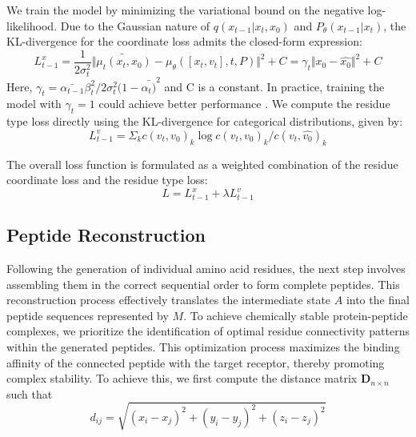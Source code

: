 \vspace{3pt} \noindent
We train the model by minimizing the variational bound on the negative log-likelihood. Due to the Gaussian nature of $q(x_{t-1}|x_t, x_0)$ and $P_{\theta}(x_{t-1}|x_t)$, the KL-divergence for the coordinate loss admits the closed-form expression:
$$L_{t-1}^x = \frac{1}{2\sigma_t^2} \Vert{\tilde{\mu_t(x_t, x_0)} - \mu_{\theta}([x_t, v_t], t, P)}\Vert^2 + C = \gamma_t\Vert{x_0 - \hat{x_0}}\Vert^2 + C$$
Here, $\gamma_t = \bar{\alpha_{t-1}}\beta_t^2/2\sigma_t^2(1-\bar{\alpha_t)}^2$ and C is a constant. In practice, training the model with $\gamma_t = 1$ could achieve better performance \cite{ho2020denoising}. We compute the residue type loss directly using the KL-divergence for categorical distributions, given by:
$$L_{t-1}^v = \Sigma_{k} c(v_t, v_0)_{k} \log c(v_t, v_0)_{k}/c(v_t, \hat{v_0})_{k}$$

\vspace{3pt} \noindent
The overall loss function is formulated as a weighted combination of the residue coordinate loss and the residue type loss:
$$L = L_{t-1}^x + \lambda L_{t-1}^v$$

\subsection{Peptide Reconstruction}

\vspace{3pt} \noindent
Following the generation of individual amino acid residues, the next step involves assembling them in the correct sequential order to form complete peptides. This reconstruction process effectively translates the intermediate state $A$ into the final peptide sequences represented by $M$. To achieve chemically stable protein-peptide complexes, we prioritize the identification of optimal residue connectivity patterns within the generated peptides. This optimization process maximizes the binding affinity of the connected peptide with the target receptor, thereby promoting complex stability. To achieve this, we first compute the distance matrix $\mathbf{D}_{n \times n}$ such that
$$d_{ij} = \sqrt{(x_i - x_j)^2 + (y_i - y_j)^2 + (z_i - z_j)^2}$$

